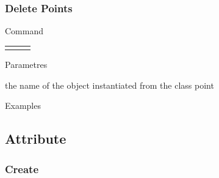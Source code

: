\documentclass[10pt]{beamer}
\begin{document}
\begin{frame}[t] \frametitle{Delete Points}

	\begin{block}{Command} 
		\begin{tabularx}{\textwidth}{@{}l@{}l@{}R}
			 &
				 & \InstrItem
		\end{tabularx}
	\end{block}

	\begin{block}{Parametres} \begin{itemize}
		 the name of the object instantiated from the class point
	\end{itemize} \end{block}

	\begin{block}{Examples}
	\end{block}

\end{frame}

\subsection{Attribute}

\subsubsection{Create}
\end{document}
